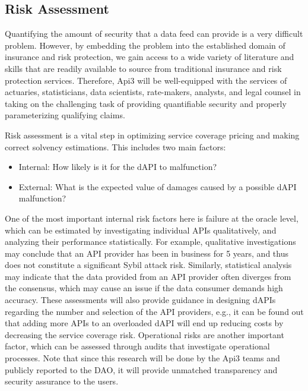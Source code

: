 \documentclass[11pt]{article}
\begin{document}
\subsection{Risk Assessment}
\label{sec:risk-assessment}

Quantifying the amount of security that a data feed can provide is a very difficult problem.
However, by embedding the problem into the established domain of insurance and risk protection, we gain access to a wide variety of literature and skills that are readily available to source from traditional insurance and risk protection services.
Therefore, Api3 will be well-equipped with the services of actuaries, statisticians, data scientists, rate-makers, analysts, and legal counsel in taking on the challenging task of providing quantifiable security and properly parameterizing qualifying claims.

Risk assessment is a vital step in optimizing service coverage pricing and making correct solvency estimations.
This includes two main factors:
\begin{itemize}
    \item Internal: How likely is it for the dAPI to malfunction?
    \item External: What is the expected value of damages caused by a possible dAPI malfunction?
\end{itemize}

One of the most important internal risk factors here is failure at the oracle level, which can be estimated by investigating individual APIs qualitatively, and analyzing their performance statistically.
For example, qualitative investigations may conclude that an API provider has been in business for 5 years, and thus does not constitute a significant Sybil attack risk.
Similarly, statistical analysis may indicate that the data provided from an API provider often diverges from the consensus, which may cause an issue if the data consumer demands high accuracy.
These assessments will also provide guidance in designing dAPIs regarding the number and selection of the API providers, e.g., it can be found out that adding more APIs to an overloaded dAPI will end up reducing costs by decreasing the service coverage risk.
Operational risks are another important factor, which can be assessed through audits that investigate operational processes.
Note that since this research will be done by the Api3 teams and publicly reported to the DAO, it will provide unmatched transparency and security assurance to the users.
\end{document}
